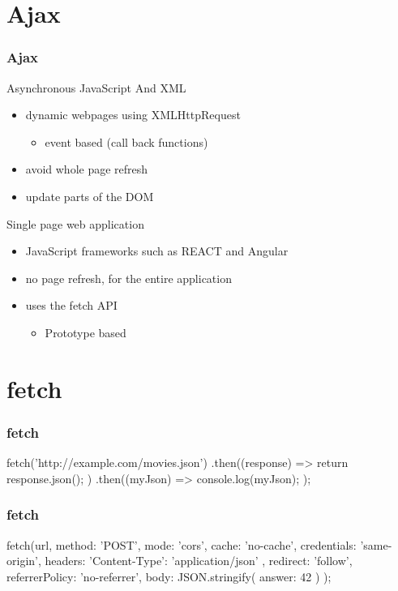 \section{Ajax}
\begin{frame}[fragile]\frametitle{Ajax}
Asynchronous JavaScript And XML
\begin{itemize}
  \item dynamic webpages using XMLHttpRequest
  \begin{itemize}
    \item event based (call back functions)
  \end{itemize}
  \item avoid whole page refresh
  \item update parts of the DOM
\end{itemize}
Single page web application
\begin{itemize}
  \item JavaScript frameworks such as REACT and Angular
  \item no page refresh, for the entire application
  \item uses the fetch API
  \begin{itemize}
    \item Prototype based
  \end{itemize}
\end{itemize}
\end{frame}

\section{fetch}
\begin{frame}[fragile]
\frametitle{fetch}
\begin{CodeBox}{}
fetch('http://example.com/movies.json')
  .then((response) => {
    return response.json();
  })
  .then((myJson) => {
    console.log(myJson);
  });
\end{CodeBox}
\end{frame}

\begin{frame}[fragile]
\frametitle{fetch}
\begin{CodeBox}{}
fetch(url, {
  method: 'POST',
  mode: 'cors',
  cache: 'no-cache',
  credentials: 'same-origin',
  headers: {
    'Content-Type': 'application/json'
  },
  redirect: 'follow',
  referrerPolicy: 'no-referrer',
  body: JSON.stringify( { answer: 42 } )
});
\end{CodeBox}
\end{frame}


